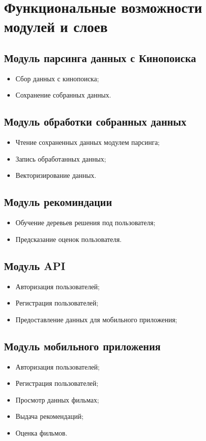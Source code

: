 \section{Функциональные возможности модулей и слоев}

\subsection{Модуль парсинга данных с Кинопоиска}
\begin{itemize}
    \item Сбор данных с кинопоиска;
    \item Сохранение собранных данных.
\end{itemize}

\subsection{Модуль обработки собранных данных}
\begin{itemize}
    \item Чтение сохраненных данных модулем парсинга;
    \item Запись обработанных данных;
    \item Векторизирование данных.
\end{itemize}

\subsection{Модуль рекоминдации}
\begin{itemize}
    \item Обучение деревьев решения под пользователя;
    \item Предсказание оценок пользователя.
\end{itemize}

\subsection{Модуль API}
\begin{itemize}
    \item Авторизация пользователей;
    \item Регистрация пользователей;
    \item Предоставление данных для мобильного приложения;
\end{itemize}

\subsection{Модуль мобильного приложения}
\begin{itemize}
    \item Авторизация пользователей;
    \item Регистрация пользователей;
    \item Просмотр данных фильмах;
    \item Выдача рекомендаций;
    \item Оценка фильмов.
\end{itemize}

